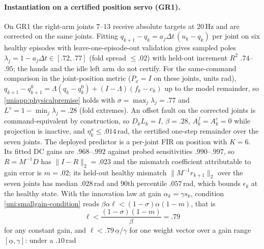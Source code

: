 %

\paragraph{Instantiation on a certified position servo (GR1).}
\label{uniapp:gr1}
On GR1 the right-arm joints $7$--$13$ receive absolute targets at $20$\,Hz and
are corrected on the same joints. Fitting
$q_{k+1}-q_k=a_j\Delta t\,(u_k-q_k)$ per joint on six healthy episodes with
leave-one-episode-out validation gives sampled poles
$\lambda_j=1-a_j\Delta t\in[.72,.77]$ (fold spread $\le.02$) with held-out
increment $R^2$ $.74$--$.95$; the hands and the idle left arm do not certify.
For the same-command comparison in the joint-position metric ($P_x=I$ on
these joints, units rad), $q_{k+1}-q^0_{k+1}=\Lambda(q_k-q^0_k)+(I-\Lambda)(f_k-c_k)$
up to the model remainder, so \eqref{uniapp:physicalpremise} holds with
$\sigma=\max_j\lambda_j=.77$ and $L^v=1-\min_j\lambda_j=.28$ (fold extremes).
An offset fault on the corrected joints is command-equivalent by construction,
so $D_kL_k=I$, $\beta=.28$, $A^f_k=A^c_k=0$ while projection is inactive, and
$\eta^x_k\le.014$\,rad, the certified one-step remainder over the seven joints.
The deployed predictor is a per-joint FIR on position with $K=6$. Its fitted
DC gains are $.968$--$.992$ against probed sensitivities $.990$--$.997$, so
$R=M^{-1}D$ has $\|I-R\|_2=.023$ and the mismatch coefficient attributable to
gain error is $m=.02$; its held-out healthy mismatch $\|M^{-1}r_{k+1}\|_2$
over the seven joints has median $.028$\,rad and 90th percentile $.057$\,rad,
which bounds $\epsilon_k$ at the healthy state. With the innovation law at
gain $\alpha_k=\gamma s_k$, condition \eqref{uni:smallgain-condition} reads
$\beta\alpha\ell<(1-\sigma)\alpha(1-m)$, that is
\begin{equation}
 \ell<\frac{(1-\sigma)(1-m)}{\beta}=.79
 \label{uniapp:gr1condition}
\end{equation}
for any constant gain, and $\ell<.79\,\underline\alpha/\gamma$ for one weight
vector over a gain range $[\underline\alpha,\gamma]$: under a $.10$\,rad

